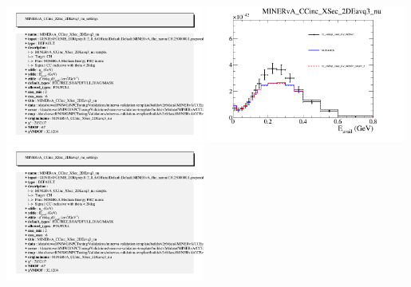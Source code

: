 \documentclass{article}
\begin{document}
\includegraphics[width=0.49\textwidth]{figures/cc_visEq3_xsec_CV_WithErr_info.png}
\centering
\includegraphics[width=0.49\textwidth]{figures/cc_visEq3_xsec_CV_WithErr_slice_5_comp.png}
\includegraphics[width=0.49\textwidth]{figures/cc_visEq3_xsec_CV_WithErr_info.png}
\end{document}
